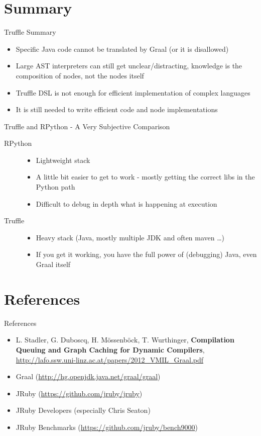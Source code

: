 \documentclass[xcolor=dvipsname,handout]{beamer} %
\begin{document}
\section{Summary}

\begin{frame}{Truffle Summary}
\begin{itemize}
 \item Specific Java code cannot be translated by Graal (or it is disallowed)
 \item Large AST interpreters can still get unclear/distracting, knowledge is the composition of nodes, not the nodes itself
 \item Truffle DSL is not enough for efficient implementation of complex languages
 \item It is still needed to write efficient code and node implementations
\end{itemize}
\end{frame}

\begin{frame}{Truffle and RPython - A Very Subjective Comparison}
\begin{description}
 \item[RPython] \begin{itemize}
  \item Lightweight stack
  \item A little bit easier to get to work - mostly getting the correct libs in the Python path
  \item Difficult to debug in depth what is happening at execution
\end{itemize}
\item[Truffle] \begin{itemize}
  \item Heavy stack (Java, mostly multiple JDK and often maven \dots)
  \item If you get it working, you have the full power of (debugging) Java, even Graal itself
\end{itemize}
\end{description}
\end{frame}


\section{References}

\begin{frame}{References}
\begin{itemize}
 \item L. Stadler, G. Duboscq, H. Mössenböck, T. Wurthinger, \textbf{Compilation Queuing and Graph Caching for Dynamic Compilers}, \small{\url{http://lafo.ssw.uni-linz.ac.at/papers/2012_VMIL_Graal.pdf}}
 \item Graal (\url{http://hg.openjdk.java.net/graal/graal})
 \item JRuby (\url{https://github.com/jruby/jruby})
 \item JRuby Developers (especially Chris Seaton)
 \item JRuby Benchmarks (\url{https://github.com/jruby/bench9000})
\end{itemize}
\end{frame}
\end{document}
